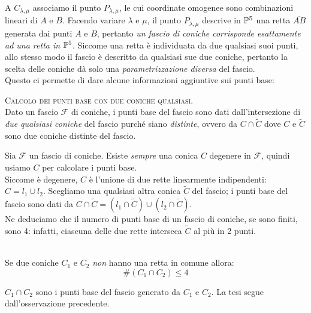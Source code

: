 A $C_{\lambda,\mu}$ associamo il punto $P_{\lambda,\mu}$, le cui coordinate omogenee sono combinazioni lineari di $A$ e $B$. Facendo variare $\lambda$ e $\mu$, il punto $P_{\lambda,\mu}$ descrive in $\proj[5]{\ }$ una retta $\overline{AB}$ generata dai punti $A$ e $B$, pertanto \textit{un fascio di coniche corrisponde esattamente ad una retta in} $\proj[5]{\ }$. Siccome una retta è individuata da due qualsiasi suoi punti, allo stesso modo il fascio è descritto da qualsiasi sue due coniche, pertanto la scelta delle coniche dà solo una \textit{parametrizzazione diversa} del fascio.\\
Questo ci permette di dare alcune informazioni aggiuntive sui punti base:
\begin{tips} \textsc{Calcolo dei punti base con due coniche qualsiasi}.\\
	Dato un fascio $\mathcal{F}$ di coniche, i punti base del fascio sono dati dall'intersezione di \textit{due qualsiasi coniche} del fascio purché siano \textit{distinte}, ovvero da $C\cap\widetilde{C}$ dove $C$ e $\widetilde{C}$ sono due coniche distinte del fascio.
\end{tips}
\begin{tips}
	Sia $\mathcal{F}$ un fascio di coniche. Esiste \textit{sempre} una conica $C$ degenere in $\mathcal{F}$, quindi usiamo $C$ per calcolare i punti base.\\
	Siccome è degenere, $C$ è l'unione di due rette linearmente indipendenti: $C=l_1\cup l_2$. Scegliamo una qualsiasi altra conica $\widetilde{C}$ del fascio; i punti base del fascio sono dati da $C\cap\widetilde{C}=(l_1\cap\widetilde{C})\cup (l_2\cap \widetilde{C})$.\\
	Ne deduciamo che il numero di punti base di un fascio di coniche, se sono finiti, sono 4: infatti, ciascuna delle due rette interseca $\widetilde{C}$ al più in 2 punti.
\end{tips}

\begin{corollary}~{}\\
	Se due coniche $C_1$ e $C_2$ \textit{non} hanno una retta in comune allora:
	\begin{equation}
		\#(C_1\cap C_2)\leq 4
	\end{equation}
\vspace{-6mm}
\end{corollary}
\begin{demonstration}
	$C_1\cap C_2$ sono i punti base del fascio generato da $C_1$ e $C_2$. La tesi segue dall'osservazione precedente.
\end{demonstration}

